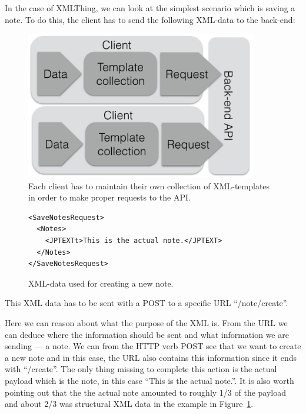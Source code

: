 \documentclass{cslthse-msc}
\begin{document}
In the case of XMLThing, we can look at the simplest scenario which is saving a note. To do this, the client has to send the following XML-data to the back-end:
\begin{figure}[H]
  \centering
    \begin{center}
      \includegraphics[width=0.9\textwidth]{images/client_templates.png}
    \end{center}
  \caption{Each client has to maintain their own collection of XML-templates in order to make proper requests to the API.}
\end{figure}

\begin{figure}[H]
  \centering
    \begin{center}
\begin{lstlisting}[breaklines=true,frame=single]
<SaveNotesRequest>
  <Notes>
    <JPTEXTt>This is the actual note.</JPTEXT>
  </Notes>
</SaveNotesRequest>
\end{lstlisting}
    \end{center}
  \caption{XML-data used for creating a new note.}
  \label{fig:xml_example}
\end{figure}


This XML data has to be sent with a POST to a specific URL \enquote{/note/create}.

Here we can reason about what the purpose of the XML is. From the URL we can deduce where the information should be sent and what information we are sending --- a note. We can from the HTTP verb POST see that we want to create a new note and in this case, the URL also contains this information since it ends with \enquote{/create}. The only thing missing to complete this action is the actual payload which is the note, in this case \enquote{This is the actual note.}. It is also worth pointing out that the the actual note amounted to roughly 1/3 of the payload and about 2/3 was structural XML data in the example in Figure~\ref{fig:xml_example}.
\end{document}
